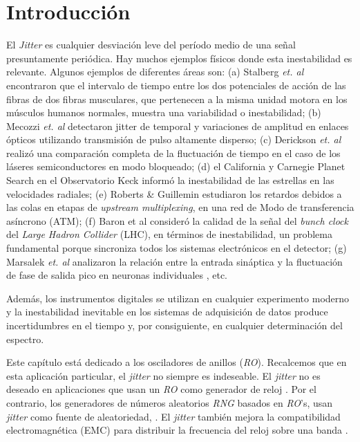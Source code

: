\section{Introducción}
\label{sec:intro}

El \emph{Jitter} es cualquier desviación leve del período medio de una señal presuntamente periódica.
Hay muchos ejemplos físicos donde esta inestabilidad es relevante.
Algunos ejemplos de diferentes áreas son:
(a) Stalberg \textit{et. al} \cite{Stalberg1971} encontraron que el intervalo de tiempo entre los dos potenciales de acción de las fibras de dos fibras musculares, que pertenecen a la misma unidad motora en los músculos humanos normales, muestra una variabilidad o inestabilidad;
(b) Mecozzi \textit{et. al} \cite{Mecozzi2001} detectaron jitter de temporal y variaciones de amplitud en enlaces ópticos utilizando transmisión de pulso altamente disperso;
(c) Derickson \textit{et. al} \cite{Derickson1991} realizó una comparación completa de la fluctuación de tiempo en el caso de los láseres semiconductores en modo bloqueado;
(d) el California y Carnegie Planet Search en el Observatorio Keck \cite{Wright2005} informó la inestabilidad de las estrellas en las velocidades radiales;
(e) Roberts \& Guillemin estudiaron los retardos debidos a las colas en etapas de \textit{upstream multiplexing}, en una red de Modo de transferencia asíncrono (ATM);
(f) Baron et al \cite{Baron2012} consideró la calidad de la señal del \textit{bunch clock} del \textit{Large Hadron Collider} (LHC), en términos de inestabilidad, un problema fundamental porque sincroniza todos los sistemas electrónicos en el detector;
(g) Marsalek \textit{et. al} analizaron la relación entre la entrada sináptica y la fluctuación de fase de salida pico en neuronas individuales \cite{Marsalek1997}, etc.

Además, los instrumentos digitales se utilizan en cualquier experimento moderno y la inestabilidad inevitable en los sistemas de adquisición de datos produce incertidumbres en el tiempo y, por consiguiente, en cualquier determinación del espectro.

Este capítulo está dedicado a los osciladores de anillos (\emph{RO}).
Recalcemos que en esta aplicación particular, el \textit{jitter} no siempre es indeseable.
El \textit{jitter} no es deseado en aplicaciones que usan un \emph{RO} como generador de reloj \cite{Buedo1998, Beomsup1990, Hajimiri1999, Mandal2010, Gupta2011}.
Por el contrario, los generadores de números aleatorios \emph{RNG} basados en \emph{RO}'s, usan \textit{jitter} como fuente de aleatoriedad, \cite{Sunar2007, Wold2009}.
El \textit{jitter} también mejora la compatibilidad electromagnética (EMC) para distribuir la frecuencia del reloj sobre una banda \cite{DeMicco2012}.

